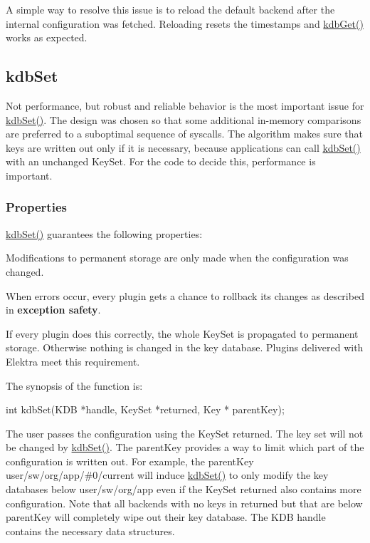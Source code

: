 A simple way to resolve this issue is to reload the default backend after the internal configuration was fetched. Reloading resets the timestamps and {\ttfamily \hyperlink{group__kdb_ga28e385fd9cb7ccfe0b2f1ed2f62453a1}{kdb\+Get()}} works as expected.

\subsection*{kdb\+Set}

Not performance, but robust and reliable behavior is the most important issue for {\ttfamily \hyperlink{group__kdb_ga11436b058408f83d303ca5e996832bcf}{kdb\+Set()}}. The design was chosen so that some additional in-\/memory comparisons are preferred to a suboptimal sequence of {\ttfamily syscalls}. The algorithm makes sure that keys are written out only if it is necessary, because applications can call {\ttfamily \hyperlink{group__kdb_ga11436b058408f83d303ca5e996832bcf}{kdb\+Set()}} with an unchanged {\ttfamily Key\+Set}. For the code to decide this, performance is important.

\subsubsection*{Properties}

{\ttfamily \hyperlink{group__kdb_ga11436b058408f83d303ca5e996832bcf}{kdb\+Set()}} guarantees the following properties\+:


\begin{DoxyItemize}
\item Modifications to permanent storage are only made when the configuration was changed.
\item When errors occur, every plugin gets a chance to rollback its changes as described in {\bfseries exception safety}.
\item If every plugin does this correctly, the whole {\ttfamily Key\+Set} is propagated to permanent storage. Otherwise nothing is changed in the key database. Plugins delivered with Elektra meet this requirement.
\end{DoxyItemize}

The synopsis of the function is\+: \begin{DoxyVerb}    int kdbSet(KDB *handle, KeySet *returned, Key * parentKey);
\end{DoxyVerb}


The user passes the configuration using the {\ttfamily Key\+Set} {\ttfamily returned}. The key set will not be changed by {\ttfamily \hyperlink{group__kdb_ga11436b058408f83d303ca5e996832bcf}{kdb\+Set()}}. The {\ttfamily parent\+Key} provides a way to limit which part of the configuration is written out. For example, the {\ttfamily parent\+Key} {\ttfamily user/sw/org/app/\#0/current} will induce {\ttfamily \hyperlink{group__kdb_ga11436b058408f83d303ca5e996832bcf}{kdb\+Set()}} to only modify the key databases below {\ttfamily user/sw/org/app} even if the {\ttfamily Key\+Set} {\ttfamily returned} also contains more configuration. Note that all backends with no keys in {\ttfamily returned} but that are below {\ttfamily parent\+Key} will completely wipe out their key database. The {\ttfamily K\+DB} handle contains the necessary data structures.

